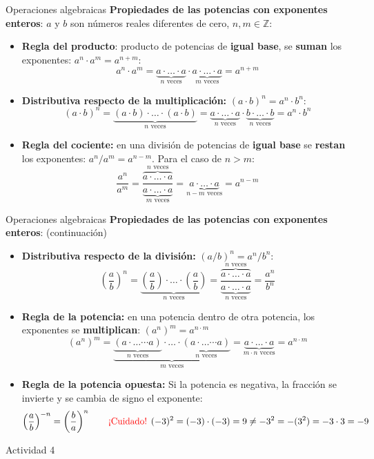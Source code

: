 \documentclass[9pt, aspectratio=169]{beamer}
\begin{document}
\begin{frame}{Operaciones algebraicas}
    \textbf{Propiedades de las potencias con exponentes enteros}: $a$ y $b$ son números reales diferentes de cero, $n, m \in \mathbb{Z}$:
\begin{itemize}
    \item \textbf{Regla del producto}: producto de potencias de \textbf{igual base}, se \textbf{suman} los exponentes: $a^n \cdot a^m = a^{n+m}$:
        \[ a^n \cdot a^m = \underbrace{a \cdot \ldots \cdot a}_{n \text{ veces}} \cdot \underbrace{a \cdot \ldots \cdot a}_{m \text{ veces}} = a^{n+m} \]
    \item \textbf{Distributiva respecto de la multiplicación:} $(a \cdot b)^n = a^n \cdot b^n$:
        \[ (a \cdot b)^n = \underbrace{(a \cdot b) \cdot \ldots \cdot (a \cdot b)}_{n \text{ veces}} = \underbrace{a \cdot \ldots \cdot a}_{n \text{ veces}} \cdot \underbrace{b \cdot \ldots \cdot b}_{n \text{ veces}} = a^n \cdot b^n \]
    \item \textbf{Regla del cociente:} en una división de potencias de \textbf{igual base} se \textbf{restan} los exponentes: $a^n/a^m = a^{n-m}$. Para el caso de $n > m$:
        \[ \frac{a^n}{a^m} = \frac{\overbrace{a \cdot \ldots \cdot a}^{n \text{ veces}}}{\underbrace{a \cdot \ldots \cdot a}_{m \text{ veces}}} = \underbrace{a \cdot \ldots \cdot a}_{n - m \text{ veces}} = a^{n-m}\]
\end{itemize}
\end{frame}


\begin{frame}{Operaciones algebraicas}
    \textbf{Propiedades de las potencias con exponentes enteros}: (continuación)
\begin{itemize}
    \item \textbf{Distributiva respecto de la división:} $(a/b)^n = a^n / b^n$:
        \[ \left(\frac{a}{b}\right)^n = \underbrace{\left(\frac{a}{b}\right) \cdot \ldots \cdot \left(\frac{a}{b}\right)}_{n \text{ veces}}  = \frac{\overbrace{a \cdot \ldots \cdot a}^{n \text{ veces}}}{\underbrace{a \cdot \ldots \cdot a}_{n \text{ veces}}} = \frac{a^n}{b^n} \]
    \item \textbf{Regla de la potencia:} en una potencia dentro de otra potencia, los exponentes se \textbf{multiplican}: $(a^n)^m = a^{n\cdot m}$
        \[ (a^n)^m = \underbrace{\underbrace{(a \cdot \ldots \cdots a)}_{n \text{ veces}} \cdot \ldots \cdot \underbrace{(a \cdot \ldots \cdots a)}_{n \text{ veces}}}_{m \text{ veces}} = \underbrace{a \cdot \ldots \cdot a}_{m \cdot n \text{ veces}} = a^{n \cdot m} \]
    \item \textbf{Regla de la potencia opuesta:} Si la potencia es negativa, la fracción se invierte y se cambia de signo el exponente: 
        \[ \left(\frac{a}{b}\right)^{-n} = \left(\frac{b}{a}\right)^n \qquad \text{\textcolor{red}{¡Cuidado! }} (-3)^2 = (-3)\cdot(-3) = 9 \neq -3^2 = -(3^2) =  -3 \cdot 3 = -9 \]
\end{itemize}
\begin{center}
    {\Large \alert{\faArrowCircleRight \faPen* Actividad 4}}
\end{center}
\end{frame}
\end{document}
